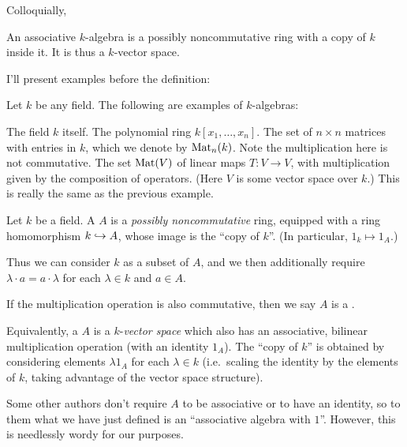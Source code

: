 Colloquially,
\begin{moral}
	An associative $k$-algebra is
	a possibly noncommutative ring with a copy of $k$ inside it.
	It is thus a $k$-vector space.
\end{moral}
I'll present examples before the definition:
\begin{example}
	Let $k$ be any field. The following are examples of $k$-algebras:
	\begin{enumerate}[(a)]
		\ii The field $k$ itself.
		\ii The polynomial ring $k[x_1, \dots, x_n]$.
		\ii The set of $n \times n$ matrices with entries in $k$,
		which we denote by $\mathrm{Mat}_n(k)$.
		Note the multiplication here is not commutative.
		\ii The set $\mathrm{Mat}(V)$ of linear maps $T \colon V \to V$,
		with multiplication given by the composition of operators.
		(Here $V$ is some vector space over $k$.)
		This is really the same as the previous example.
	\end{enumerate}
\end{example}
\begin{definition}
	Let $k$ be a field.
	A  $A$ is a \emph{possibly noncommutative} ring,
	equipped with a ring homomorphism $k \hookrightarrow A$,
	whose image is the ``copy of $k$''.
	(In particular, $1_k \mapsto 1_A$.)

	Thus we can consider $k$ as a subset of $A$, and
	we then additionally require $\lambda \cdot a = a \cdot \lambda$
	for each $\lambda \in k$ and $a \in A$.

	If the multiplication operation is also commutative,
	then we say $A$ is a .
\end{definition}
\begin{definition}
	Equivalently, a  $A$ is a
	$k$-\emph{vector space} which also has an associative,
	bilinear multiplication operation (with an identity $1_A$).
	The ``copy of $k$'' is obtained by considering elements
	$\lambda 1_A$ for each $\lambda \in k$
	(i.e.\ scaling the identity by the elements of $k$,
	taking advantage of the vector space structure).
\end{definition}

\begin{abuse}
	Some other authors don't require $A$ to be associative or to have
	an identity, so to them what we have just defined is an
	``associative algebra with $1$''.
	However, this is needlessly wordy for our purposes.
\end{abuse}

